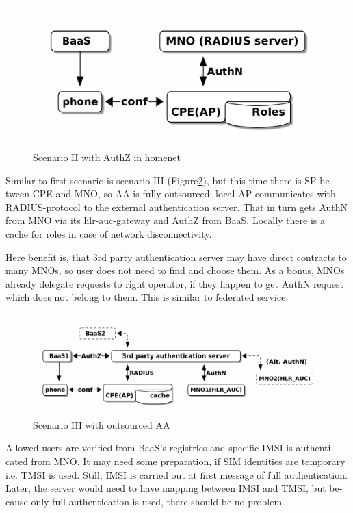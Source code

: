 \documentclass[12pt,a4paper,english]{tutthesis}
\begin{document}
\begin{otherlanguage}{english}
\begin{figure}[htb]
\centering
\includegraphics[width=.9\linewidth]{scenII.png}
\caption{\label{fig:scenario-II}Scenario II with AuthZ in homenet}
\end{figure}


\label{scenario-iii}

Similar to first scenario is scenario III (Figure\ref{fig:scenario-III}), 
but this time there is SP between CPE and MNO, so AA is fully outsourced:
local AP communicates with RADIUS-protocol to the external
authentication server. That in turn gets AuthN from MNO via its
hlr-auc-gateway and AuthZ from BaaS.
Locally there is a cache for roles in case of network disconnectivity.

Here benefit is, that 3rd party authentication server may have direct
contracts to many MNOs, so user does not need to find and choose
them. As a bonus,  MNOs already delegate requests to right operator, if
they happen to get AuthN request which does not belong to them.
This is similar to federated service.

\begin{figure}[htb]
\centering
\includegraphics[width=.9\linewidth]{scenIII.png}
\caption{\label{fig:scenario-III}Scenario III with outsourced AA}
\end{figure}

Allowed users are verified from BaaS's registries and specific IMSI is
authenticated from MNO.  It may need some preparation, if SIM
identities are temporary i.e. TMSI is used.  Still, IMSI is carried out at first message
of full authentication. Later, the server would need to have mapping
between IMSI and TMSI, but because only full-authentication is used,
there should be no problem.



\end{otherlanguage}
\end{document}
